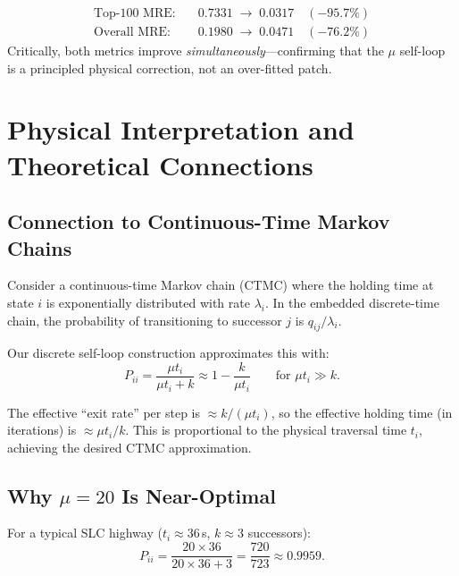 \documentclass[12pt,a4paper]{article}
\theoremstyle{definition}
\theoremstyle{plain}
\begin{document}
\begin{result}
  \begin{align*}
    \text{Top-100 MRE:} &\quad 0.7331 \;\longrightarrow\; \mathbf{0.0317}
      \quad (-95.7\%)\\
    \text{Overall MRE:} &\quad 0.1980 \;\longrightarrow\; \mathbf{0.0471}
      \quad (-76.2\%)
  \end{align*}
  Critically, both metrics improve \emph{simultaneously}---confirming that the $\mu$
  self-loop is a principled physical correction, not an over-fitted patch.
\end{result}

\section{Physical Interpretation and Theoretical Connections}

\subsection{Connection to Continuous-Time Markov Chains}

Consider a continuous-time Markov chain (CTMC) where the holding time at state $i$ is
exponentially distributed with rate $\lambda_i$. In the embedded discrete-time chain,
the probability of transitioning to successor $j$ is $q_{ij} / \lambda_i$.

Our discrete self-loop construction approximates this with:
\begin{equation}
  P_{ii} = \frac{\mu t_i}{\mu t_i + k} \approx 1 - \frac{k}{\mu t_i}
  \qquad \text{for } \mu t_i \gg k.
\end{equation}

The effective ``exit rate'' per step is $\approx k/(\mu t_i)$, so the effective
holding time (in iterations) is $\approx \mu t_i / k$. This is proportional to the
physical traversal time $t_i$, achieving the desired CTMC approximation.

\subsection{Why $\mu=20$ Is Near-Optimal}

For a typical SLC highway ($t_i \approx 36$\,s, $k \approx 3$ successors):
\begin{equation}
  P_{ii} = \frac{20 \times 36}{20 \times 36 + 3} = \frac{720}{723} \approx 0.9959.
\end{equation}
\end{document}

